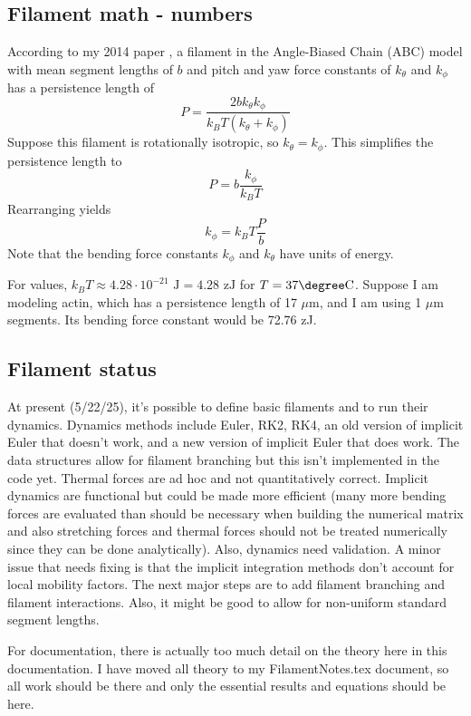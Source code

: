 \documentclass {scrbook}
\begin{document}
\subsection{Filament math - numbers}

According to my 2014 paper \cite{Andrews_2014}, a filament in the Angle-Biased Chain (ABC) model with mean segment lengths of $b$ and pitch and yaw force constants of $k_{\theta}$ and $k_{\phi}$ has a persistence length of
$$P=\frac{2 b k_{\theta} k_{\phi}}{k_BT (k_{\theta} + k_{\phi})}$$
Suppose this filament is rotationally isotropic, so $k_{\theta} = k_{\phi}$. This simplifies the persistence length to
$$P=b \frac{k_{\phi}}{k_BT}$$
Rearranging yields
$$k_{\phi}=k_B T \frac{P}{b}$$
Note that the bending force constants $k_{\phi}$ and $k_{\theta}$ have units of energy.

For values, $k_B T \approx 4.28\cdot10^{-21} \textrm{ J} = 4.28 \textrm{ zJ}$ for $T=37\degree \textrm{C}$. Suppose I am modeling actin, which has a persistence length of 17 $\mu$m, and I am using 1 $\mu$m segments. Its bending force constant would be 72.76 zJ.


\subsection{Filament status}

At present (5/22/25), it's possible to define basic filaments and to run their dynamics. Dynamics methods include Euler, RK2, RK4, an old version of implicit Euler that doesn't work, and a new version of implicit Euler that does work. The data structures allow for filament branching but this isn't implemented in the code yet. Thermal forces are ad hoc and not quantitatively correct. Implicit dynamics are functional but could be made more efficient (many more bending forces are evaluated than should be necessary when building the numerical matrix and also stretching forces and thermal forces should not be treated numerically since they can be done analytically). Also, dynamics need validation. A minor issue that needs fixing is that the implicit integration methods don't account for local mobility factors. The next major steps are to add filament branching and filament interactions. Also, it might be good to allow for non-uniform standard segment lengths.

For documentation, there is actually too much detail on the theory here in this documentation. I have moved all theory to my FilamentNotes.tex document, so all work should be there and only the essential results and equations should be here.
\end{document}
